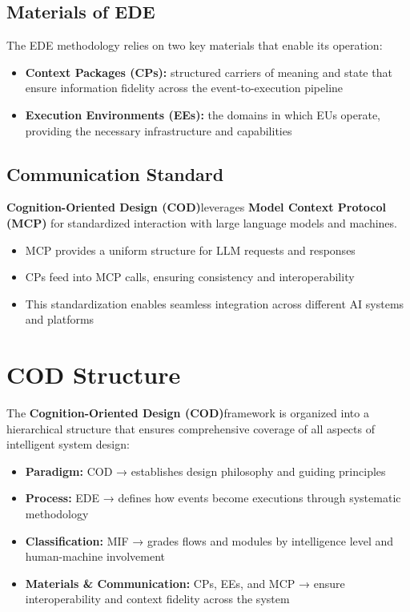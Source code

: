 \documentclass[12pt,a4paper]{article}
\newcommand{\cod}{\textbf{Cognition-Oriented Design (COD)}}
\begin{document}
\subsection{Materials of EDE}

The EDE methodology relies on two key materials that enable its operation:

\begin{itemize}
\item \textbf{Context Packages (CPs):} structured carriers of meaning and state that ensure information fidelity across the event-to-execution pipeline
\item \textbf{Execution Environments (EEs):} the domains in which EUs operate, providing the necessary infrastructure and capabilities
\end{itemize}

\subsection{Communication Standard}

\cod leverages \textbf{Model Context Protocol (MCP)} for standardized interaction with large language models and machines.

\begin{itemize}
\item MCP provides a uniform structure for LLM requests and responses
\item CPs feed into MCP calls, ensuring consistency and interoperability
\item This standardization enables seamless integration across different AI systems and platforms
\end{itemize}

\section{COD Structure}

The \cod framework is organized into a hierarchical structure that ensures comprehensive coverage of all aspects of intelligent system design:

\begin{itemize}
\item \textbf{Paradigm:} COD → establishes design philosophy and guiding principles
\item \textbf{Process:} EDE → defines how events become executions through systematic methodology
\item \textbf{Classification:} MIF → grades flows and modules by intelligence level and human-machine involvement
\item \textbf{Materials \& Communication:} CPs, EEs, and MCP → ensure interoperability and context fidelity across the system
\end{itemize}
\end{document}

